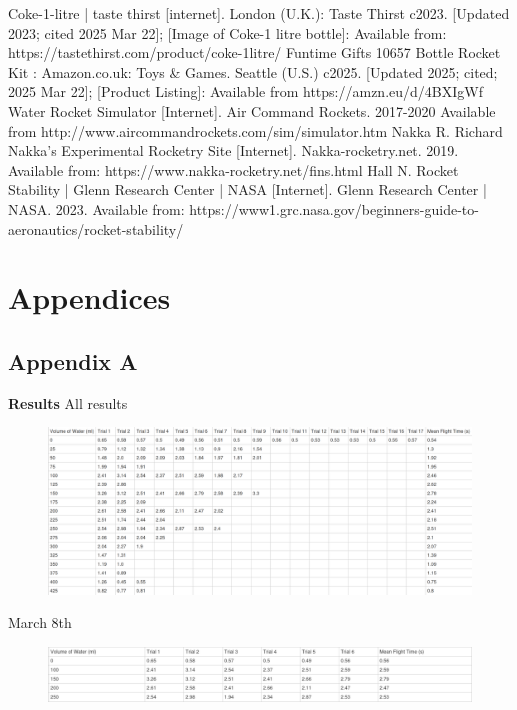 \documentclass[14pt]{article}
\begin{document}
\begin{thebibliography}{0}

Coke-1-litre | taste thirst [internet]. London (U.K.): Taste Thirst c2023. [Updated 2023; cited 2025 Mar 22]; [Image of Coke-1 litre bottle]: Available from: https://tastethirst.com/product/coke-1litre/
Funtime Gifts 10657 Bottle Rocket Kit : Amazon.co.uk: Toys \& Games. Seattle (U.S.) c2025. [Updated 2025; cited; 2025 Mar 22]; [Product Listing]: Available from https://amzn.eu/d/4BXIgWf
Water Rocket Simulator [Internet]. Air Command Rockets. 2017-2020 Available from http://www.aircommandrockets.com/sim/simulator.htm
Nakka R. Richard Nakka’s Experimental Rocketry Site [Internet]. Nakka-rocketry.net. 2019. Available from: https://www.nakka-rocketry.net/fins.html
Hall N. Rocket Stability | Glenn Research Center | NASA [Internet]. Glenn Research Center | NASA. 2023. Available from: https://www1.grc.nasa.gov/beginners-guide-to-aeronautics/rocket-stability/
\end{thebibliography}

\section{Appendices}
\subsection{Appendix A}
\label {Appendix A}
\textbf{Results}
\FloatBarrier
All results
\begin{figure}[h]
    \centering
    \includegraphics[width=\textwidth]{data/all_data.png}
\end{figure}
\FloatBarrier

March 8th
\begin{figure}[h]
    \centering
    \includegraphics[width=\textwidth]{data/8th.png}
\end{figure}
\FloatBarrier
\end{document}
